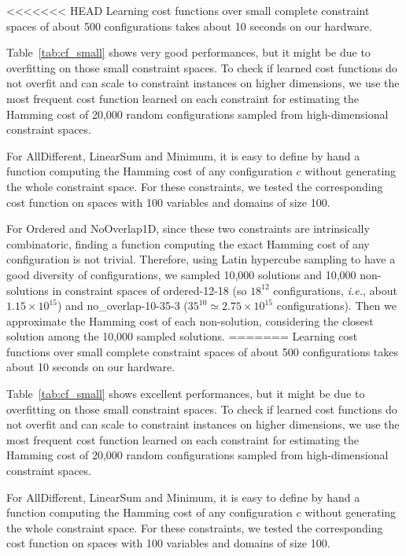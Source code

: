 \documentclass{article}
\newcommand{\ie}{\textit{i.e.}}
\begin{document}
<<<<<<< HEAD
Learning cost functions over small complete constraint spaces of about
500 configurations takes about 10 seconds on our hardware.

Table~\ref{tab:cf_small} shows very good performances, but it might be
due  to overfitting  on those  small constraint  spaces.  To  check if
learned  cost functions  do not  overfit and  can scale  to constraint
instances on higher dimensions, we use the most frequent cost function
learned on each  constraint for estimating the Hamming  cost of 20,000
random configurations sampled from high-dimensional constraint spaces.

For AllDifferent, LinearSum and Minimum, it  is easy to define by hand
a function computing the Hamming cost of any configuration $c$ without
generating  the  whole constraint  space.  For  these constraints,  we
tested the  corresponding cost function  on spaces with  100 variables
and domains of size 100.

For  Ordered   and  NoOverlap1D,  since  these   two  constraints  are
intrinsically  combinatoric, finding  a function  computing the  exact
Hamming cost  of any configuration  is not trivial.   Therefore, using
Latin hypercube sampling  to have a good  diversity of configurations,
we  sampled 10,000  solutions and  10,000 non-solutions  in constraint
spaces  of  ordered-12-18  (so $18^{12}$  configurations,  \ie,  about
$1.15\times         10^{15}$)          and         no\_overlap-10-35-3
($35^{10}  \simeq   2.75\times  10^{15}$  configurations).    Then  we
approximate  the Hamming  cost of  each non-solution,  considering the
closest solution among the 10,000 sampled solutions.
=======
Learning cost functions over small complete constraint spaces of about 500 configurations takes about 10 seconds on our hardware.

Table~\ref{tab:cf_small} shows excellent performances, but it might be due to overfitting on those small constraint spaces.  To check if learned cost functions do not overfit and can scale to constraint instances on higher dimensions, we use the most frequent cost function learned on each constraint for estimating the Hamming cost of 20,000 random configurations sampled from high-dimensional constraint spaces.

For AllDifferent, LinearSum and Minimum, it is easy to define by hand a function computing the Hamming cost of any configuration $c$ without generating the whole constraint space.  For these constraints,  we tested the corresponding cost function on spaces with  100 variables and domains of size 100.
\end{document}
